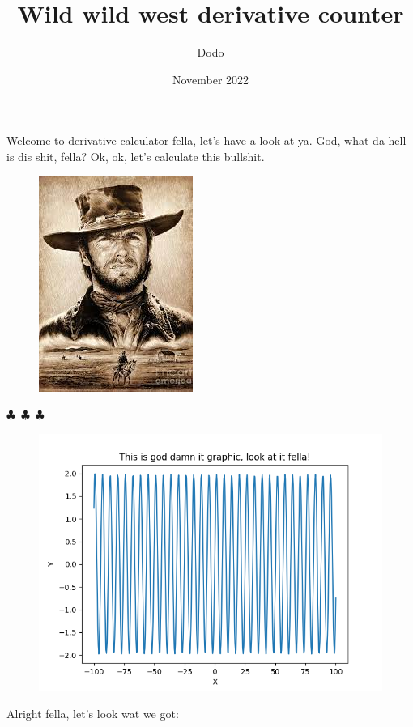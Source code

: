 \documentclass{article}
\title{Wild wild west derivative counter}
\author{Dodo}
\date{November 2022}
\begin{document}
    \maketitle
    
        Welcome to derivative calculator fella, let's have a look at ya. God, what da hell is dis shit, fella?
        Ok, ok, let's calculate this bullshit.

        \begin{center}\begin{figure}[H] \includegraphics[scale=0.6]{funny_pics/cowboy.jpg} \end{figure}\end{center}
        \begin{center}
        $\clubsuit$~$\clubsuit$~$\clubsuit$
        \end{center}

    \begin{figure}[H] \includegraphics[scale=0.6]{function_graph.png} \end{figure}Alright fella, let's look wat we got:
\end{document}
